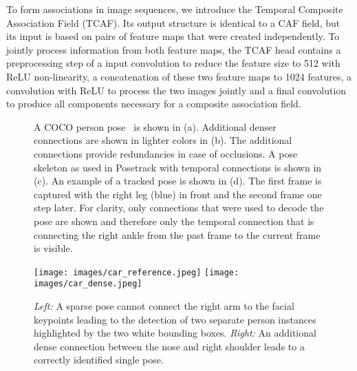 \documentclass[journal]{IEEEtran}
\begin{document}
To form
associations in image sequences, we introduce the Temporal Composite
Association Field (TCAF).
Its output structure is identical to a CAF
field, but its input is based on pairs of feature maps that were created
independently.
To jointly process information from both feature maps, the TCAF head
contains a preprocessing step of a  input convolution to reduce the feature size to 512 with ReLU non-linearity, a concatenation of these two feature maps to 1024 features, a  convolution with ReLU to process the two images jointly and a final  convolution to produce all components necessary for a composite association field.



\begin{figure}[t]
  \centering
       
  \caption{
    A COCO person pose~\cite{lin2014microsoft} is shown in (a).
    Additional denser connections are shown in lighter colors in (b).
    The additional connections provide redundancies in case of occlusions.
    A pose skeleton as used in Posetrack with temporal connections
    is shown in (c).
    An example of a tracked pose is shown in (d). The first frame is captured with the right leg (blue) in front and the second frame one step later.
    For clarity, only connections that were used to decode the pose are shown and therefore only the temporal
    connection that is connecting the right ankle from the past frame to the current frame is visible.
  }
  \label{fig:poses2}
\end{figure}


\begin{figure}[t]
  \centering
    \texttt{[image: images/car\_reference.jpeg]}
    \texttt{[image: images/car\_dense.jpeg]}
  \caption{
    \emph{Left:} A sparse pose
    cannot connect the right arm to the facial keypoints leading to the detection
    of two separate person instances highlighted by the two white bounding boxes.
    \emph{Right:}
    An additional dense connection between the nose and right shoulder leads
    to a correctly identified single pose.
  }
  \label{fig:qual-dense}
\end{figure}
\end{document}
